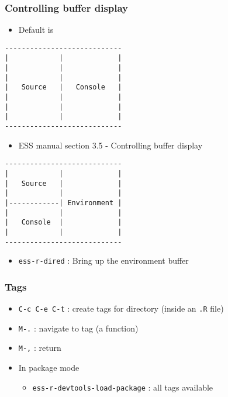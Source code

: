 \documentclass[11pt]{article}
\begin{document}
\subsubsection{Controlling buffer display}
\label{sec:org3fe484d}

\begin{itemize}
\item Default is
\end{itemize}

\begin{verbatim}
----------------------------
|            |             |
|            |             |
|            |             |
|   Source   |   Console   |
|            |             |
|            |             |
|            |             |
----------------------------
\end{verbatim}

\begin{itemize}
\item ESS manual section 3.5 - Controlling buffer display
\end{itemize}

\begin{verbatim}
----------------------------
|            |             |
|   Source   |             |
|            |             |
|------------| Environment |
|            |             |
|   Console  |             |
|            |             |
----------------------------
\end{verbatim}

\begin{itemize}
\item \texttt{ess-r-dired} : Bring up the environment buffer
\end{itemize}

\subsubsection{Tags}
\label{sec:org8a286f0}

\begin{itemize}
\item \texttt{C-c C-e C-t} : create tags for directory (inside an \texttt{.R} file)

\item \texttt{M-.}         : navigate to tag (a function)

\item \texttt{M-,}         : return

\item In package mode

\begin{itemize}
\item \texttt{ess-r-devtools-load-package} : all tags available
\end{itemize}
\end{itemize}
\end{document}

